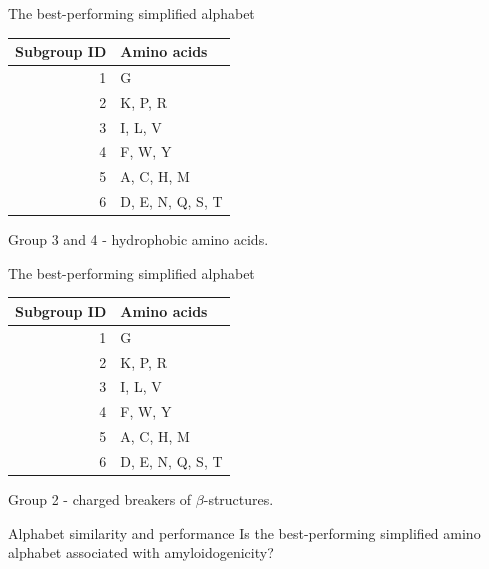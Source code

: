 \documentclass{beamer}\usepackage[]{graphicx}\usepackage[]{color}
\begin{document}
     \begin{frame}{The best-performing simplified alphabet}
   \begin{table}[ht]
\centering
\begin{tabular}{rl}
  \toprule
Subgroup ID & Amino acids \\ 
  \midrule
  1 & G \\ 
   \rowcolor[gray]{0.85}  2 & K, P, R \\ 
   \rowcolor{firebrick1} 3 & I, L, V \\ 
   \rowcolor{darkorange}  4 & F, W, Y \\ 
    5 & A, C, H, M \\ 
   \rowcolor[gray]{0.85}  6 & D, E, N, Q, S, T \\ 
   \bottomrule
\end{tabular}
\end{table}
   
Group 3 and 4 - hydrophobic amino acids.  
   \end{frame}
  
  
     \begin{frame}{The best-performing simplified alphabet}
   \begin{table}[ht]
\centering
\begin{tabular}{rl}
  \toprule
Subgroup ID & Amino acids \\ 
  \midrule
  1 & G \\ 
   \rowcolor{dodgerblue}  2 & K, P, R \\ 
    3 & I, L, V \\ 
   \rowcolor[gray]{0.85}  4 & F, W, Y \\ 
    5 & A, C, H, M \\ 
   \rowcolor[gray]{0.85}  6 & D, E, N, Q, S, T \\ 
   \bottomrule
\end{tabular}
\end{table}
   
Group 2 - charged breakers of $\beta$-structures.  
   
   \end{frame}  
   
\begin{frame}{Alphabet similarity and performance}
Is the best-performing simplified amino alphabet associated with amyloidogenicity?
\end{frame}
\end{document}
